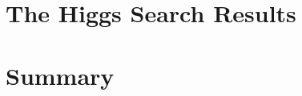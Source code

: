 \documentclass{cmspaper}
\begin{document}

\section{The Higgs Search Results}
   \label{sec:dataresults}
   

\section{Summary}
     \label{sec:summary}

%

\clearpage 
\appendix
\appendixpage


\end{document}
